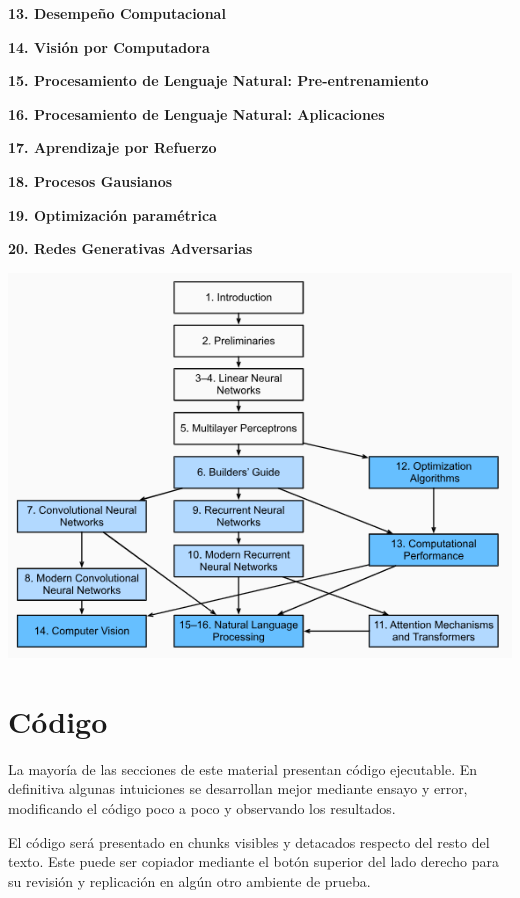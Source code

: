 \documentclass[
]{book}
\begin{document}
\textbf{13. Desempeño Computacional}

\textbf{14. Visión por Computadora}

\textbf{15. Procesamiento de Lenguaje Natural: Pre-entrenamiento}

\textbf{16. Procesamiento de Lenguaje Natural: Aplicaciones}

\textbf{17. Aprendizaje por Refuerzo}

\textbf{18. Procesos Gausianos}

\textbf{19. Optimización paramétrica}

\textbf{20. Redes Generativas Adversarias}

\begin{center}\includegraphics[width=500pt]{img/00-presentacion/estructura} \end{center}

\hypertarget{cuxf3digo}{%
\section*{Código}\label{cuxf3digo}}

La mayoría de las secciones de este material presentan código ejecutable. En definitiva algunas intuiciones se desarrollan mejor mediante ensayo y error, modificando el código poco a poco y observando los resultados.

El código será presentado en chunks visibles y detacados respecto del resto del texto. Este puede ser copiador mediante el botón superior del lado derecho para su revisión y replicación en algún otro ambiente de prueba.
\end{document}
